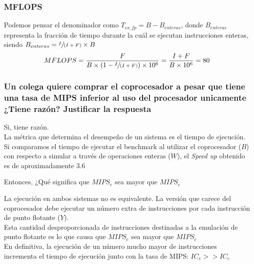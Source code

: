 \documentclass{beamer}
\begin{document}
\begin{frame}
\frametitle{MFLOPS}
Podemos pensar el denominador como $T_{ex\_fp} = B - B_{enteras}$, donde $B_{enteras}$ representa la fracción 
de tiempo durante la cuál se ejecutan instrucciones enteras, siendo $B_{enteras} = \sfrac{I}{(I+F)} \times B $
%
\medskip
\begin{displaymath}
MFLOPS = \frac{F}{B \times (1 - \sfrac{I}{(I + F)}) \times 10^6} = \frac {I + F}{B \times 10^6}  = 80
\end{displaymath}
\end{frame}

\begin{frame}
\frametitle{Un colega quiere comprar el coprocesador a pesar que tiene una tasa de MIPS inferior al uso del procesador
unicamente ¿Tiene razón? Justificar la respuesta}

Si, tiene razón.\\
\medskip
La métrica que determina el desempeño de un sistema es el tiempo de ejecución. Si comparamos el tiempo de ejecutar
el benchmark al utilizar el coprocesador ($B$) con respecto a simular a través de operaciones enteras ($W$), el 
\textit{Speed up} obtenido es de aproximadamente $3.6$

\bigskip
Entonces, ¿Qué significa que $MIPS_{e}$ sea mayor que $MIPS_{c}$
\end{frame}

\begin{frame}

La ejecución en ambos sistemas no es equivalente. La versión que carece del coprocesador debe ejecutar un número extra
de instrucciones por cada instrucción de punto flotante ($Y$).\\ 
\medskip
Esta cantidad desproporcionada de instrucciones destinadas a la emulación de punto flotante es lo que causa que 
$MIPS_{e}$ sea mayor que $MIPS_{c}$\\
\medskip
En definitiva, la ejecución de un número mucho mayor de instrucciones incrementa el tiempo de ejecución junto con
la tasa de MIPS: $IC_{e} >> IC_{c} $
\end{frame}
%
\end{document}
